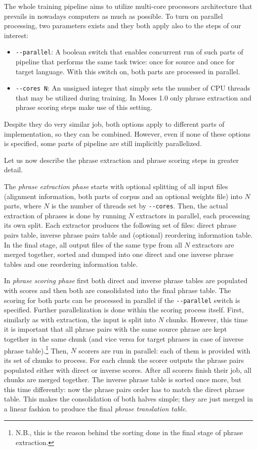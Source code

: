 The whole training pipeline aims to utilize multi-core processors architecture that
prevails in nowadays computers as much as possible. To turn on parallel processing,
two parameters exists and they both apply also to the steps of our interest:
\begin{itemize}
  \item \verb|--parallel|: A boolean switch that enables concurrent run of such parts of
  pipeline that performs the same task twice: once for source and once for target language.
  With this switch on, both parts are processed in parallel.
  \item \verb|--cores N|: An unsigned integer that simply sets the number of CPU threads
  that may be utilized during training. In Moses 1.0 only phrase extraction and phrase
  scoring steps make use of this setting.
\end{itemize}
Despite they do very similar job, both options apply to different parts
of implementation, so they can be combined.
However, even if none of these options is specified, some parts of pipeline
are still implicitly parallelized.

Let us now describe the phrase extraction and phrase scoring steps in greater detail.

The \emph{phrase extraction phase} starts with optional splitting of all input files
(alignment information, both parts of corpus and an optional weights file) into $N$
parts, where $N$ is the number of threads set by \verb|--cores|.
Then, the actual extraction of phrases is done by running $N$ extractors in parallel,
each processing its own split.
Each extractor produces the following set of files: direct phrase pairs table, inverse
phrase pairs table and (optional) reordering information table.
In the final stage, all output files of the same type from all $N$ extractors are
merged together, sorted and dumped into one direct and one inverse phrase tables
and one reordering information table.

In \emph{phrase scoring phase} first both direct and inverse phrase tables are
populated with scores and then both are consolidated into the final phrase table.
The scoring for both parts can be processed in parallel if the \verb|--parallel|
switch is specified.
Further parallelization is done within the scoring process itself.
First, similarly as with extraction, the input is split into $N$ chunks.
However, this time it is important that all phrase pairs with the same source
phrase are kept together in the same chunk (and vice versa for target phrases
in case of inverse phrase table).\footnote{N.B., this is the reason behind
the sorting done in the final stage of phrase extraction.}
Then, $N$ scorers are run in parallel: each of them is provided with its set
of chunks to process.
For each chunk the scorer outputs the phrase pairs populated either with direct
or inverse scores.
After all scorers finish their job, all chunks are merged together.
The inverse phrase table is sorted once more, but this time differently:
now the phrase pairs order has to match the direct phrase table.
This makes the consolidation of both halves simple; they are just merged
in a linear fashion to produce the final \emph{phrase translation table}.

